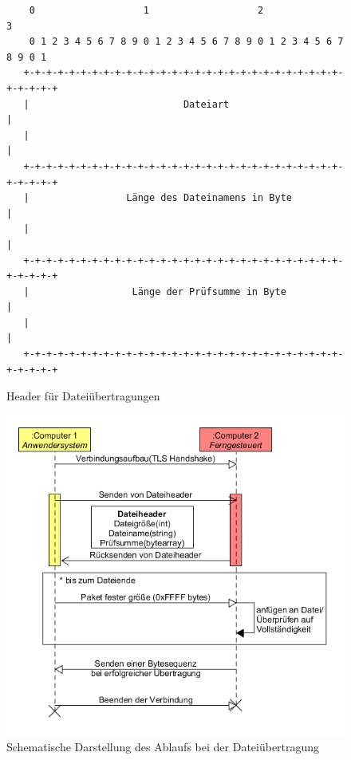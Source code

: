 \begin{figure}[h]
\begin{lstlisting}
	0                   1                   2                   3
    0 1 2 3 4 5 6 7 8 9 0 1 2 3 4 5 6 7 8 9 0 1 2 3 4 5 6 7 8 9 0 1
   +-+-+-+-+-+-+-+-+-+-+-+-+-+-+-+-+-+-+-+-+-+-+-+-+-+-+-+-+-+-+-+-+
   |                           Dateiart                            |
   |                                                               |
   +-+-+-+-+-+-+-+-+-+-+-+-+-+-+-+-+-+-+-+-+-+-+-+-+-+-+-+-+-+-+-+-+
   |                 Länge des Dateinamens in Byte                 |
   |                                                               |
   +-+-+-+-+-+-+-+-+-+-+-+-+-+-+-+-+-+-+-+-+-+-+-+-+-+-+-+-+-+-+-+-+
   |                  Länge der Prüfsumme in Byte                  |
   |                                                               |
   +-+-+-+-+-+-+-+-+-+-+-+-+-+-+-+-+-+-+-+-+-+-+-+-+-+-+-+-+-+-+-+-+
\end{lstlisting}
\caption{Header für Dateiübertragungen}
\label{Datei_Header}
\end{figure}

\begin{figure}
\includegraphics[scale=.5]{diagramFileProtocol}
\caption{Schematische Darstellung des Ablaufs bei der Dateiübertragung}
\label{file_diagram}
\end{figure}

